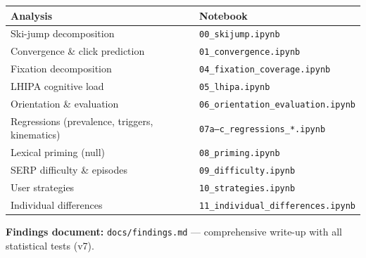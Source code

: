 \documentclass[10pt,twocolumn,letterpaper]{article}
\begin{document}
\begin{small}
\begin{tabular}{@{}ll@{}}
\toprule
Analysis & Notebook \\
\midrule
Ski-jump decomposition & \texttt{00\_skijump.ipynb} \\
Convergence \& click prediction & \texttt{01\_convergence.ipynb} \\
Fixation decomposition & \texttt{04\_fixation\_coverage.ipynb} \\
LHIPA cognitive load & \texttt{05\_lhipa.ipynb} \\
Orientation \& evaluation & \texttt{06\_orientation\_evaluation.ipynb} \\
Regressions (prevalence, triggers, kinematics) & \texttt{07a--c\_regressions\_*.ipynb} \\
Lexical priming (null) & \texttt{08\_priming.ipynb} \\
SERP difficulty \& episodes & \texttt{09\_difficulty.ipynb} \\
User strategies & \texttt{10\_strategies.ipynb} \\
Individual differences & \texttt{11\_individual\_differences.ipynb} \\
\bottomrule
\end{tabular}
\end{small}

\vspace{4pt}
\noindent\textbf{Findings document:} \texttt{docs/findings.md} --- comprehensive write-up with all statistical tests (v7).
\end{document}
